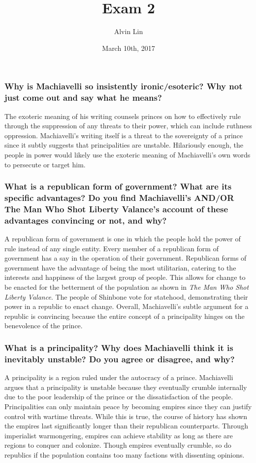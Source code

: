 \documentclass[letterpaper, 12pt]{article}
\title{Exam 2}
\author{Alvin Lin}
\date{March 10th, 2017}
\begin{document}
\maketitle

\subsubsection*{Why is Machiavelli so insistently ironic/esoteric? Why not
just come out and say what he means?}
The exoteric meaning of his writing counsels princes on how to effectively rule through the suppression of any threats to their power, which can include ruthness oppression. Machiavelli's writing itself is a threat to the sovereignty of a prince since it subtly suggests that principalities are unstable. Hilariously enough, the people in power would likely use the exoteric meaning of Machiavelli's own words to persecute or target him.

\subsubsection*{What is a republican form of government? What are its specific
advantages? Do you find Machiavelli’s AND/OR The Man Who Shot Liberty Valance’s
account of these advantages convincing or not, and why?}
A republican form of government is one in which the people hold the power of rule instead of any single entity. Every member of a republican form of government has a say in the operation of their government. Republican forms of government have the advantage of being the most utilitarian, catering to the interests and happiness of the largest group of people. This allows for change to be enacted for the betterment of the population as shown in \textit{The Man Who Shot Liberty Valance}. The people of Shinbone vote for statehood, demonstrating their power in a republic to enact change. Overall, Machiavelli's subtle argument for a republic is convincing because the entire concept of a principality hinges on the benevolence of the prince.

\subsubsection*{What is a principality? Why does Machiavelli think it is
inevitably unstable? Do you agree or disagree, and why?}
A principality is a region ruled under the autocracy of a prince. Machiavelli argues that a principality is unstable because they eventually crumble internally due to the poor leadership of the prince or the dissatisfaction of the people. Principalities can only maintain peace by becoming empires since they can justify control with wartime threats. While this is true, the course of history has shown the empires last significantly longer than their republican counterparts. Through imperialist warmongering, empires can achieve stability as long as there are regions to conquer and colonize. Though empires eventually crumble, so do republics if the population contains too many factions with dissenting opinions.
\end{document}
